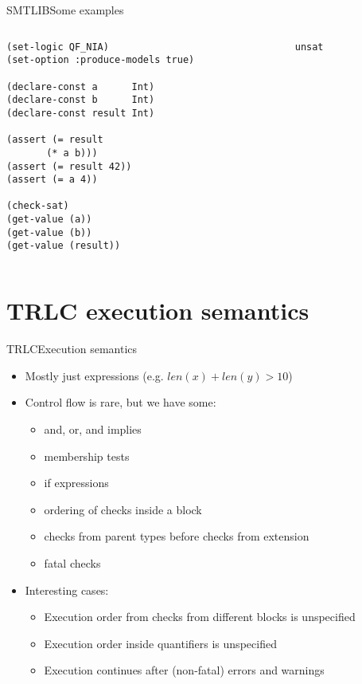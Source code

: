 \documentclass[aspectratio=169]{beamer}
\begin{document}
\begin{frame}[fragile]{SMTLIB}{Some examples}
  \begin{columns}
    \begin{column}{0.5\textwidth}
      \begin{lstlisting}[language=SMTLIB]
(set-logic QF_NIA)
(set-option :produce-models true)

(declare-const a      Int)
(declare-const b      Int)
(declare-const result Int)

(assert (= result
	   (* a b)))
(assert (= result 42))
(assert (= a 4))

(check-sat)
(get-value (a))
(get-value (b))
(get-value (result))
\end{lstlisting}
\end{column}
    \pause
    \begin{column}{0.5\textwidth}
      \begin{scriptsize}
\begin{verbatim}
unsat
\end{verbatim}
      \end{scriptsize}
    \end{column}
  \end{columns}
\end{frame}

\section{TRLC execution semantics}

\begin{frame}{TRLC}{Execution semantics}
  \begin{itemize}
  \item Mostly just expressions (e.g. $len(x) + len(y) > 10$)
  \item Control flow is rare, but we have some:
    \begin{itemize}
    \item and, or, and implies
    \item membership tests
    \item if expressions
    \item ordering of checks inside a block
    \item checks from parent types before checks from extension
    \item fatal checks
    \end{itemize}
  \item Interesting cases:
    \begin{itemize}
    \item Execution order from checks from different blocks is unspecified
    \item Execution order inside quantifiers is unspecified
    \item Execution continues after (non-fatal) errors and warnings
    \end{itemize}
  \end{itemize}
\end{frame}
\end{document}
